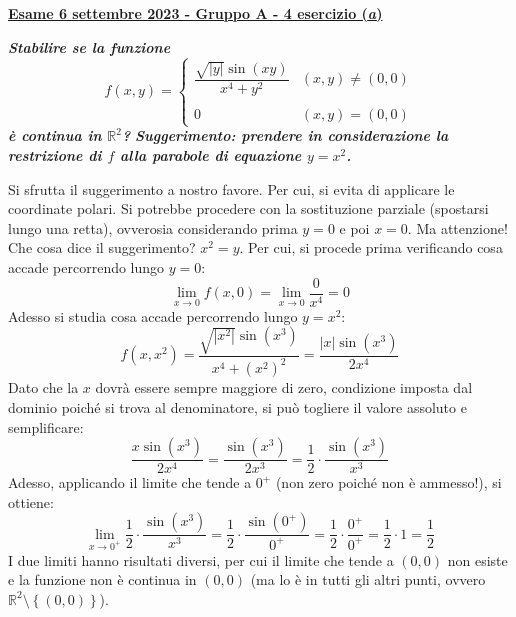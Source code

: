 \documentclass[a4paper]{article}
\newcommand{\definition}[1]{\textcolor{Red3}{\textbf{#1}}}
\newcommand{\example}[1]{\textcolor{Green4}{\textbf{#1}}}
\begin{document}
	\begin{flushleft}\label{exam: esame 06 settembre 2023 - Gruppo A - 4 esercizio (a)}
		\definition{\underline{Esame 6 settembre 2023 - Gruppo A - 4 esercizio (\emph{a})}}
	\end{flushleft}
	\example{\emph{Stabilire se la funzione}
	\begin{equation*}
		f\left(x,y\right) = \begin{cases}
			\dfrac{\sqrt{\left|y\right|} \sin\left(xy\right)}{x^{4} + y^{2}} & \left(x,y\right) \ne \left(0,0\right) \\
			\\
			0 & \left(x,y\right) = \left(0,0\right)
		\end{cases}
	\end{equation*}
	\emph{è continua in $\mathbb{R}^{2}$?}}\newline
	\example{\emph{Suggerimento: prendere in considerazione la restrizione di $f$ alla parabole di equazione $y=x^{2}$.}}\newline

	\noindent
	Si sfrutta il suggerimento a nostro favore. Per cui, si evita di applicare le coordinate polari. Si potrebbe procedere con la sostituzione parziale (spostarsi lungo una retta), ovverosia considerando prima $y=0$ e poi $x=0$. Ma attenzione! Che cosa dice il suggerimento? $x^{2} = y$. Per cui, si procede prima verificando cosa accade percorrendo lungo $y = 0$:
	\begin{equation*}
		\displaystyle\lim_{x \rightarrow 0} f\left(x,0\right) = \displaystyle\lim_{x \rightarrow 0} \dfrac{0}{x^{4}} = 0
	\end{equation*}
	Adesso si studia cosa accade percorrendo lungo $y = x^{2}$:
	\begin{equation*}
		f\left(x,x^{2}\right) 
		= 
		\dfrac{\sqrt{\left|x^{2}\right|} \sin\left(x^{3}\right)}{x^{4}+\left(x^{2}\right)^{2}}
		=
		\dfrac{\left|x\right| \sin\left(x^{3}\right)}{2x^{4}}
	\end{equation*}
	Dato che la $x$ dovrà essere sempre maggiore di zero, condizione imposta dal dominio poiché si trova al denominatore, si può togliere il valore assoluto e semplificare:
	\begin{equation*}
		\dfrac{x \sin\left(x^{3}\right)}{2x^{4}} = \dfrac{\sin\left(x^{3}\right)}{2x^{3}} = \dfrac{1}{2}\cdot \dfrac{\sin\left(x^{3}\right)}{x^{3}}
	\end{equation*}
	Adesso, applicando il limite che tende a $0^{+}$ (non zero poiché non è ammesso!), si ottiene:
	\begin{equation*}
		\displaystyle\lim_{x \rightarrow 0^{+}} \dfrac{1}{2}\cdot \dfrac{\sin\left(x^{3}\right)}{x^{3}} 
		= 
		\dfrac{1}{2}\cdot \dfrac{\sin\left(0^{+}\right)}{0^{+}} 
		= 
		\dfrac{1}{2} \cdot \dfrac{0^{+}}{0^{+}}
		=
		\dfrac{1}{2} \cdot 1
		=
		\dfrac{1}{2}
	\end{equation*}
	I due limiti hanno risultati diversi, per cui il limite che tende a $\left(0,0\right)$ non esiste e la funzione non è continua in $\left(0,0\right)$ (ma lo è in tutti gli altri punti, ovvero $\mathbb{R}^{2} \setminus \left\{\left(0,0\right)\right\}$).
\end{document}
